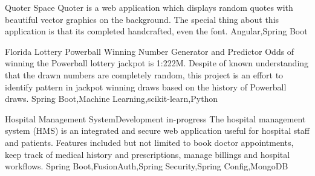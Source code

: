 

\begin{projects}
	\project
	{Quoter Space}{}
	{}
	{Quoter is a web application which displays random quotes with beautiful vector graphics on the background. The special thing about this application is that its completed handcrafted, even the font.}
	{Angular,Spring Boot}
				
	\project
	{Florida Lottery Powerball Winning Number Generator and Predictor}{}
	{ }
	{Odds of winning the Powerball lottery jackpot is 1:222M. Despite of known understanding that the drawn numbers are completely random, this project is an effort to identify pattern in jackpot winning draws based on the history of Powerball draws.}
	{Spring Boot,Machine Learning,scikit-learn,Python}
	
    \project
	{Hospital Management System}{}{Development in-progress}
	{The hospital management system (HMS) is an integrated and secure web application useful for hospital staff and patients. Features included but not limited to book doctor appointments, keep track of medical history and prescriptions, manage billings and hospital workflows.}
	{Spring Boot,FusionAuth,Spring Security,Spring Config,MongoDB}

\end{projects}